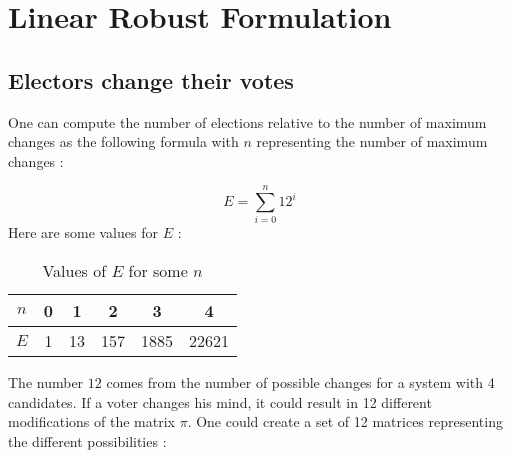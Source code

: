 \section{Linear Robust Formulation}
\setcounter{subsection}{5}
\subsection{Electors change their votes}
One can compute the number of elections relative to the number of maximum changes as the following formula with $n$ representing the number of maximum changes :

$$E = \sum_{i=0}^n 12^i$$
\newpage
Here are some values for $E$ : 

\begin{table}[!h]
\centering
\begin{tabular}{|c|c|c|c|c|c|}
\hline
$n$ & 0 & 1  & 2   & 3    & 4     \\ \hline
$E$ & 1 & 13 & 157 & 1885 & 22621 \\ \hline
\end{tabular}
\caption{Values of $E$ for some $n$}
\label{tab:E_N}
\end{table}

The number $12$ comes from the number of possible changes for a system with 4 candidates. If a voter changes his mind, it could result in 12 different modifications of the matrix $\pi$. One could create a set of 12 matrices representing the different possibilities : 

